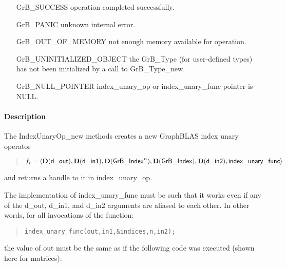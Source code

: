 \begin{itemize}[leftmargin=2.1in]
\item[{\sf GrB\_SUCCESS}]           operation completed successfully.
\item[{\sf GrB\_PANIC}]             unknown internal error.
\item[{\sf GrB\_OUT\_OF\_MEMORY}]          not enough memory available for operation.
\item[{\sf GrB\_UNINITIALIZED\_OBJECT}]          the {\sf GrB\_Type} (for user-defined types)
                                    has not been initialized by a call to {\sf GrB\_Type\_new}.
\item[{\sf GrB\_NULL\_POINTER}]    {\sf index\_unary\_op} or {\sf index\_unary\_func} pointer is {\sf NULL}.

\end{itemize}

\paragraph{Description}

The {\sf IndexUnaryOp\_new} methods creates a new GraphBLAS index unary operator
\begin{quote}
$f_{i} = \langle \mathbf{D}({\sf d\_out}), \mathbf{D}({\sf d\_in1}), \mathbf{D}({\sf GrB\_Index}^n), \mathbf{D}({\sf GrB\_Index}), \mathbf{D}({\sf d\_in2}), {\sf index\_unary\_func} \rangle$
\end{quote}
and returns a handle to it in {\sf index\_unary\_op}.

The implementation of {\sf index\_unary\_func} must be such that it works
even if any of the {\sf d\_out}, {\sf d\_in1}, and {\sf d\_in2} arguments are aliased to each other.
In other words, for all invocations of the function:
\begin{quote}
\begin{verbatim}
index_unary_func(out,in1,&indices,n,in2);
\end{verbatim}
\end{quote}
the value of {\sf out} must be the same as if the following code
was executed (shown here for matrices):

